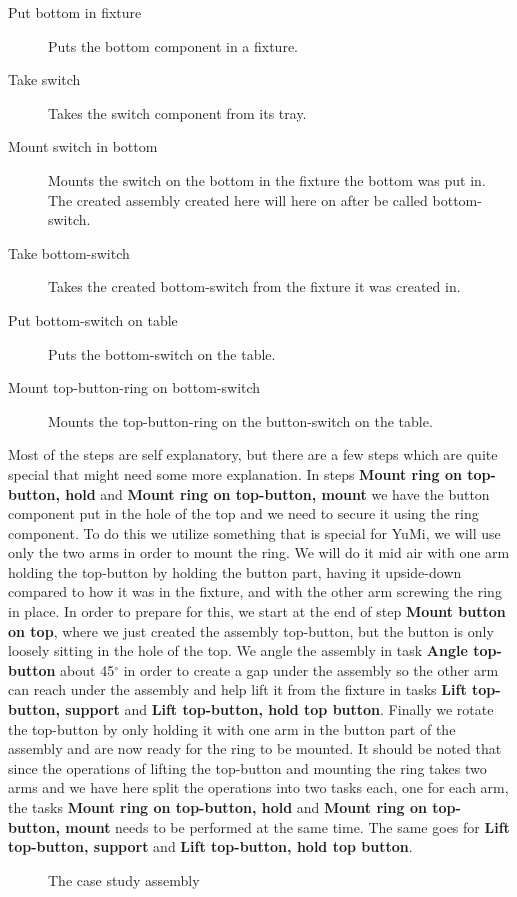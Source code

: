 \begin{description}
\item[Put bottom in fixture] Puts the bottom component in a fixture.

\item[Take switch] Takes the switch component from its tray.

\item[Mount switch in bottom] Mounts the switch on the bottom in the fixture the bottom was put in. The created assembly created here will here on after be called bottom-switch.

\item[Take bottom-switch] Takes the created bottom-switch from the fixture it was created in.

\item[Put bottom-switch on table] Puts the bottom-switch on the table.

\item[Mount top-button-ring on bottom-switch] Mounts the top-button-ring on the button-switch on the table.
\end{description}

\noindent Most of the steps are self explanatory, but there are a few steps which are quite special that might need some more explanation. In steps \textbf{Mount ring on top-button, hold} and \textbf{Mount ring on top-button, mount} we have the button component put in the hole of the top and we need to secure it using the ring component. To do this we utilize something that is special for YuMi\textsuperscript\textregistered, we will use only the two arms in order to mount the ring. We will do it mid air with one arm holding the top-button by holding the button part, having it upside-down compared to how it was in the fixture, and with the other arm screwing the ring in place. In order to prepare for this, we start at the end of step \textbf{Mount button on top}, where we just created the assembly top-button, but the button is only loosely sitting in the hole of the top. We angle the assembly in task \textbf{Angle top-button} about 45$^\circ$ in order to create a gap under the assembly so the other arm can reach under the assembly and help lift it from the fixture in tasks \textbf{Lift top-button, support} and \textbf{Lift top-button, hold top button}. Finally we rotate the top-button by only holding it with one arm in the button part of the assembly and are now ready for the ring to be mounted.
It should be noted that since the operations of lifting the top-button and mounting the ring takes two arms and we have here split the operations into two tasks each, one for each arm, the tasks \textbf{Mount ring on top-button, hold} and \textbf{Mount ring on top-button, mount} needs to be performed at the same time. The same goes for  \textbf{Lift top-button, support} and \textbf{Lift top-button, hold top button}.

\begin{landscape}
\begin{figure}

\caption{The case study assembly}
\end{figure}
\end{landscape}

%